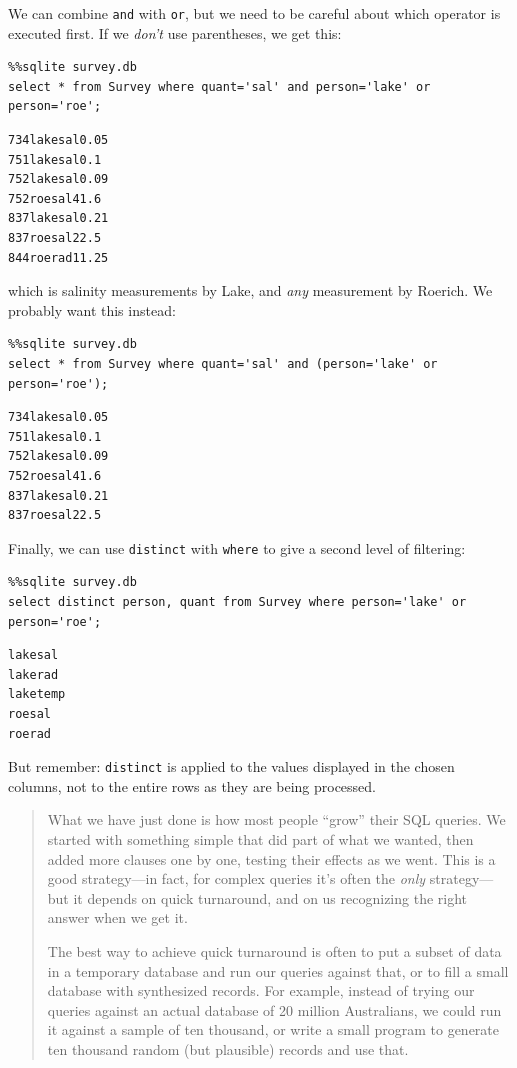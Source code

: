 \documentclass[]{book}
\begin{document}
We can combine \texttt{and} with \texttt{or}, but we need to be careful
about which operator is executed first. If we \emph{don't} use
parentheses, we get this:

\begin{verbatim}
%%sqlite survey.db
select * from Survey where quant='sal' and person='lake' or person='roe';
\end{verbatim}

\begin{verbatim}
734lakesal0.05
751lakesal0.1
752lakesal0.09
752roesal41.6
837lakesal0.21
837roesal22.5
844roerad11.25
\end{verbatim}

which is salinity measurements by Lake, and \emph{any} measurement by
Roerich. We probably want this instead:

\begin{verbatim}
%%sqlite survey.db
select * from Survey where quant='sal' and (person='lake' or person='roe');
\end{verbatim}

\begin{verbatim}
734lakesal0.05
751lakesal0.1
752lakesal0.09
752roesal41.6
837lakesal0.21
837roesal22.5
\end{verbatim}

Finally, we can use \texttt{distinct} with \texttt{where} to give a
second level of filtering:

\begin{verbatim}
%%sqlite survey.db
select distinct person, quant from Survey where person='lake' or person='roe';
\end{verbatim}

\begin{verbatim}
lakesal
lakerad
laketemp
roesal
roerad
\end{verbatim}

But remember: \texttt{distinct} is applied to the values displayed in
the chosen columns, not to the entire rows as they are being processed.

\begin{quote}
What we have just done is how most people ``grow'' their SQL queries. We
started with something simple that did part of what we wanted, then
added more clauses one by one, testing their effects as we went. This is
a good strategy---in fact, for complex queries it's often the
\emph{only} strategy---but it depends on quick turnaround, and on us
recognizing the right answer when we get it.

The best way to achieve quick turnaround is often to put a subset of
data in a temporary database and run our queries against that, or to
fill a small database with synthesized records. For example, instead of
trying our queries against an actual database of 20 million Australians,
we could run it against a sample of ten thousand, or write a small
program to generate ten thousand random (but plausible) records and use
that.
\end{quote}
\end{document}
